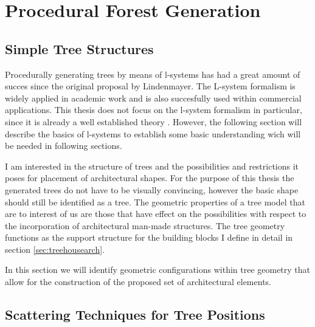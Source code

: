 

\chapter{Procedural Forest Generation}
\label{sec:pfg}

\section{Simple Tree Structures}

Procedurally generating trees by means of l-systems has had a great amount of succes since the original proposal by Lindenmayer. The L-system formalism is widely applied in  academic work and is also succesfully used within commercial applications. This thesis does not focus on the l-system formalism in particular, since it is already a well established theory \citet{PrzemyslawAlgoBeauty}. However, the following section will describe the basics of l-systems to establish some basic understanding wich will be needed in following sections. 


I am interested in the structure of trees and the possibilities and restrictions it poses for placement of 
architectural shapes. For the purpose of this thesis the generated trees do not have to be visually convincing, 
however the basic shape should still be identified as a tree. The geometric properties of a tree model that are to interest of us are those that have effect on the possibilities with respect to the incorporation of architectural man-made structures. The tree geometry functions as the support structure for the building blocks I define in detail in section \ref{sec:treehousearch}. 

In this section we will identify geometric configurations within tree geometry that allow for the construction of the proposed set of architectural elements.  

\section{Scattering Techniques for Tree Positions}
\label{subsec:scattering}


\citet{mickwestgamasutra}
%


